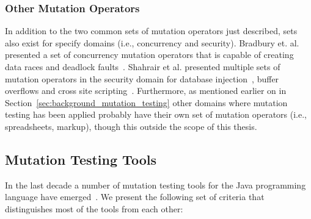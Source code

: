 \subsubsection{Other Mutation Operators}
\label{subsubsec:background_other_operators}
In addition to the two common sets of mutation operators just described, sets also exist for specify domains (i.e., concurrency and security). Bradbury et. al. presented a set of concurrency mutation operators that is capable of creating data races and deadlock faults~\cite{BCD06}. Shahrair et al. presented multiple sets of mutation operators in the security domain for database injection~\cite{SZ08b}, buffer overflows\cite{SZ08} and cross site scripting~\cite{SZ08a}. Furthermore, as mentioned earlier on in Section~\ref{sec:background_mutation_testing} other domains where mutation testing has been applied probably have their own set of mutation operators (i.e., spreadsheets, markup), though this outside the scope of this thesis.


\subsection{Mutation Testing Tools}
\label{subsec:background_mutation_tools}
In the last decade a number of mutation testing tools for the Java programming language have emerged~\cite{JH10}. We present the following set of criteria that distinguishes most of the tools from each other:


